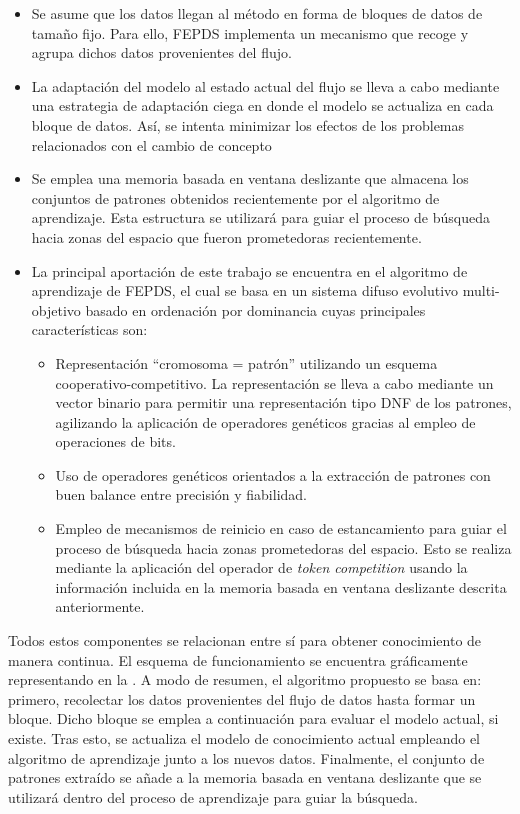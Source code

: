 \documentclass[c5paper,10pt,twoside]{book}	   	%
\begin{document}
\begin{itemize}
	\item Se asume que los datos llegan al método en forma de bloques de datos de tamaño fijo. Para ello, FEPDS implementa un mecanismo que recoge y agrupa dichos datos provenientes del flujo.
	
	\item La adaptación del modelo al estado actual del flujo se lleva a cabo mediante una estrategia de adaptación ciega en donde el modelo se actualiza en cada bloque de datos. Así, se intenta minimizar los efectos de los problemas relacionados con el cambio de concepto  
	
	\item Se emplea una memoria basada en ventana deslizante que almacena los conjuntos de patrones obtenidos recientemente por el algoritmo de aprendizaje. Esta estructura se utilizará para guiar el proceso de búsqueda hacia zonas del espacio que fueron prometedoras recientemente.
	
	\item La principal aportación de este trabajo se encuentra en el algoritmo de aprendizaje de FEPDS, el cual se basa en un sistema difuso evolutivo multi-objetivo basado en ordenación por dominancia cuyas principales características son:
	
	\begin{itemize}
		\item Representación ``cromosoma = patrón'' utilizando un esquema co\-ope\-ra\-ti\-vo-competitivo. La representación se lleva a cabo mediante un vector binario para permitir una representación tipo \ac{DNF} de los patrones, agilizando la aplicación de operadores genéticos gracias al empleo de operaciones de bits.
		
		\item Uso de operadores genéticos orientados a la extracción de patrones con buen balance entre precisión y fiabilidad.
		
		\item Empleo de mecanismos de reinicio en caso de estancamiento para guiar el proceso de búsqueda hacia zonas prometedoras del espacio. Esto se realiza mediante la aplicación del operador de \textit{token competition} usando la información incluida en la memoria basada en ventana deslizante descrita anteriormente.
	\end{itemize}
\end{itemize}

Todos estos componentes se relacionan entre sí para obtener conocimiento de manera continua. El esquema de funcionamiento se encuentra gráficamente representando en la . A modo de resumen, el algoritmo propuesto se basa en: primero, recolectar los datos provenientes del flujo de datos hasta formar un bloque. Dicho bloque se emplea a continuación para evaluar el modelo actual, si existe. Tras esto, se actualiza el modelo de conocimiento actual empleando el algoritmo de aprendizaje junto a los nuevos datos. Finalmente, el conjunto de patrones extraído se añade a la memoria basada en ventana deslizante que se utilizará dentro del proceso de aprendizaje para guiar la búsqueda.
\end{document}

